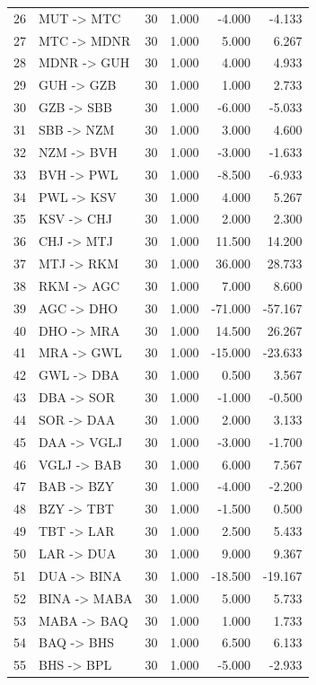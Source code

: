 \begin{longtable}{r p{} r r r r}
26 & MUT -> MTC & 30 & 1.000 & -4.000 & -4.133 \\
27 & MTC -> MDNR & 30 & 1.000 & 5.000 & 6.267 \\
28 & MDNR -> GUH & 30 & 1.000 & 4.000 & 4.933 \\
29 & GUH -> GZB & 30 & 1.000 & 1.000 & 2.733 \\
30 & GZB -> SBB & 30 & 1.000 & -6.000 & -5.033 \\
31 & SBB -> NZM & 30 & 1.000 & 3.000 & 4.600 \\
32 & NZM -> BVH & 30 & 1.000 & -3.000 & -1.633 \\
33 & BVH -> PWL & 30 & 1.000 & -8.500 & -6.933 \\
34 & PWL -> KSV & 30 & 1.000 & 4.000 & 5.267 \\
35 & KSV -> CHJ & 30 & 1.000 & 2.000 & 2.300 \\
36 & CHJ -> MTJ & 30 & 1.000 & 11.500 & 14.200 \\
37 & MTJ -> RKM & 30 & 1.000 & 36.000 & 28.733 \\
38 & RKM -> AGC & 30 & 1.000 & 7.000 & 8.600 \\
39 & AGC -> DHO & 30 & 1.000 & -71.000 & -57.167 \\
40 & DHO -> MRA & 30 & 1.000 & 14.500 & 26.267 \\
41 & MRA -> GWL & 30 & 1.000 & -15.000 & -23.633 \\
42 & GWL -> DBA & 30 & 1.000 & 0.500 & 3.567 \\
43 & DBA -> SOR & 30 & 1.000 & -1.000 & -0.500 \\
44 & SOR -> DAA & 30 & 1.000 & 2.000 & 3.133 \\
45 & DAA -> VGLJ & 30 & 1.000 & -3.000 & -1.700 \\
46 & VGLJ -> BAB & 30 & 1.000 & 6.000 & 7.567 \\
47 & BAB -> BZY & 30 & 1.000 & -4.000 & -2.200 \\
48 & BZY -> TBT & 30 & 1.000 & -1.500 & 0.500 \\
49 & TBT -> LAR & 30 & 1.000 & 2.500 & 5.433 \\
50 & LAR -> DUA & 30 & 1.000 & 9.000 & 9.367 \\
51 & DUA -> BINA & 30 & 1.000 & -18.500 & -19.167 \\
52 & BINA -> MABA & 30 & 1.000 & 5.000 & 5.733 \\
53 & MABA -> BAQ & 30 & 1.000 & 1.000 & 1.733 \\
54 & BAQ -> BHS & 30 & 1.000 & 6.500 & 6.133 \\
55 & BHS -> BPL & 30 & 1.000 & -5.000 & -2.933 \\

\end{longtable}
